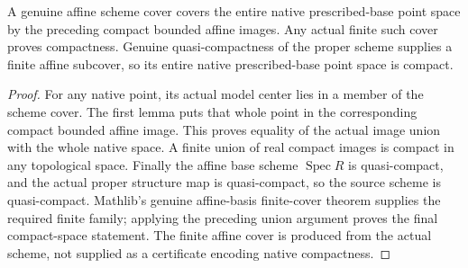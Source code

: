 \begin{theorem}
\label{scheme:proper-native-compactness}
\leanok
{}
A genuine affine scheme cover covers the entire native prescribed-base
point space by the preceding compact bounded affine images. Any actual
finite such cover proves compactness. Genuine quasi-compactness of the
proper scheme supplies a finite affine subcover, so its entire native
prescribed-base point space is compact.
\end{theorem}
\begin{proof}
For any native point, its actual model center lies in a member of the
scheme cover. The first lemma puts that whole point in the corresponding
compact bounded affine image. This proves equality of the actual image
union with the whole native space. A finite union of real compact images
is compact in any topological space. Finally the affine base scheme
$\operatorname{Spec}R$ is quasi-compact, and the actual proper structure
map is quasi-compact, so the source scheme is quasi-compact. Mathlib's
genuine affine-basis finite-cover theorem supplies the required finite
family; applying the preceding union argument proves the final compact-space
statement. The finite affine cover is produced from the actual scheme,
not supplied as a certificate encoding native compactness.
\end{proof}
